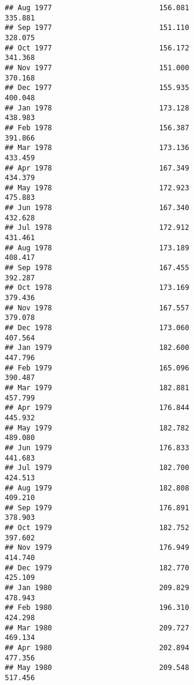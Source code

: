 \documentclass[
]{article}
\begin{document}
\begin{verbatim}
## Aug 1977                         156.081                           335.881
## Sep 1977                         151.110                           328.075
## Oct 1977                         156.172                           341.368
## Nov 1977                         151.000                           370.168
## Dec 1977                         155.935                           400.048
## Jan 1978                         173.128                           438.983
## Feb 1978                         156.387                           391.866
## Mar 1978                         173.136                           433.459
## Apr 1978                         167.349                           434.379
## May 1978                         172.923                           475.883
## Jun 1978                         167.340                           432.628
## Jul 1978                         172.912                           431.461
## Aug 1978                         173.189                           408.417
## Sep 1978                         167.455                           392.287
## Oct 1978                         173.169                           379.436
## Nov 1978                         167.557                           379.078
## Dec 1978                         173.060                           407.564
## Jan 1979                         182.600                           447.796
## Feb 1979                         165.096                           390.487
## Mar 1979                         182.881                           457.799
## Apr 1979                         176.844                           445.932
## May 1979                         182.782                           489.080
## Jun 1979                         176.833                           441.683
## Jul 1979                         182.700                           424.513
## Aug 1979                         182.808                           409.210
## Sep 1979                         176.891                           378.903
## Oct 1979                         182.752                           397.602
## Nov 1979                         176.949                           414.740
## Dec 1979                         182.770                           425.109
## Jan 1980                         209.829                           478.943
## Feb 1980                         196.310                           424.298
## Mar 1980                         209.727                           469.134
## Apr 1980                         202.894                           477.356
## May 1980                         209.548                           517.456

\end{verbatim}
\end{document}
